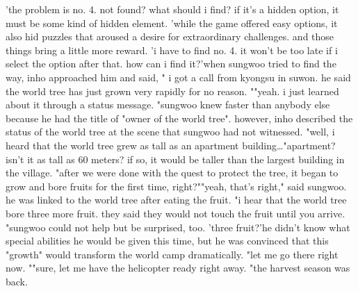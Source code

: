 'the problem is no.
 4.
 not found? what should i find? if it's a hidden option, it must be some kind of hidden element.
'while the game offered easy options, it also hid puzzles that aroused a desire for extraordinary challenges.
 and those things bring a little more reward.
'i have to find no.
 4.
 it won't be too late if i select the option after that.
 how can i find it?'when sungwoo tried to find the way, inho approached him and said, " i got a call from kyongsu in suwon.
 he said the world tree has just grown very rapidly for no reason.
""yeah.
 i just learned about it through a status message.
"sungwoo knew faster than anybody else because he had the title of "owner of the world tree".
 however, inho described the status of the world tree at the scene that sungwoo had not witnessed.
"well, i heard that the world tree grew as tall as an apartment building…"apartment? isn't it as tall as 60 meters? if so, it would be taller than the largest building in the village.
"after we were done with the quest to protect the tree, it began to grow and bore fruits for the first time, right?""yeah, that's right," said sungwoo.
he was linked to the world tree after eating the fruit.
"i hear that the world tree bore three more fruit.
 they said they would not touch the fruit until you arrive.
"sungwoo could not help but be surprised, too.
 'three fruit?'he didn't know what special abilities he would be given this time, but he was convinced that this "growth" would transform the world camp dramatically.
"let me go there right now.
""sure, let me have the helicopter ready right away.
"the harvest season was back.


 